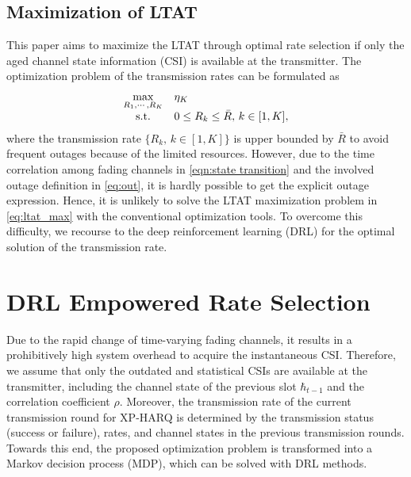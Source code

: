 \documentclass[lettersize,journal]{IEEEtran}
\begin{document}
\subsection{Maximization of LTAT}
This paper aims to maximize the LTAT through optimal rate selection if only the aged channel state information (CSI) is available at the transmitter. The optimization problem of the transmission rates can be formulated as
\begin{equation}\label{eq:ltat_max}
 \begin{array}{*{20}{c l}}
{\mathop {\max }\limits_{{R_1}, \cdots ,{R_K}} }& \eta_K\\
{{\rm{s}}{\rm{.t}}{\rm{.}}}&{0 \le {R_k} \le \bar R,\,k\in [1,K]},
\end{array}
\end{equation}
where the transmission rate $\{R_k,\,k\in [1,K]\}$ is upper bounded by $\bar R$ to avoid frequent outages because of the limited resources. %
However, due to the time correlation among fading channels in \eqref{eqn:state transition} and the involved outage definition in \eqref{eq:out}, it is hardly possible to get the explicit outage expression. Hence, it is unlikely to solve the LTAT maximization problem in \eqref{eq:ltat_max} with the conventional optimization tools. To overcome this difficulty, we recourse to the deep reinforcement learning (DRL) for the optimal solution of the transmission rate.

\section{DRL Empowered Rate Selection}\label{sec:rein}
Due to the rapid change of time-varying fading channels, it results in a prohibitively high system overhead to acquire the instantaneous CSI. Therefore, we assume that only the outdated and statistical CSIs are available at the transmitter, including the channel state of the previous slot $\hbar _{t-1}$ and the correlation coefficient $\rho$. Moreover, the transmission rate of the current transmission round for XP-HARQ is determined by the transmission status (success or failure), rates, and channel states in the previous transmission rounds. Towards this end, the proposed optimization problem is transformed into a Markov decision process (MDP), which can be solved with DRL methods.
\end{document}
